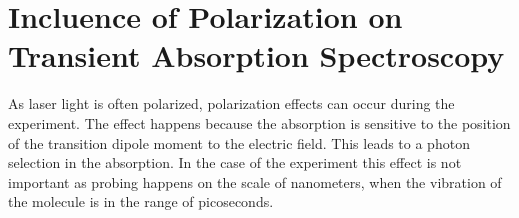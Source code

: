 \section{Incluence of Polarization on Transient Absorption Spectroscopy}
\label{sec:polLight}

As laser light is often polarized, polarization effects can occur during the experiment. The effect happens because the absorption is sensitive to the position of the transition dipole moment to the electric field. This leads to a photon selection in the absorption. In the case of the experiment this effect is not important as probing happens on the scale of nanometers, when the vibration of the molecule is in the range of picoseconds.